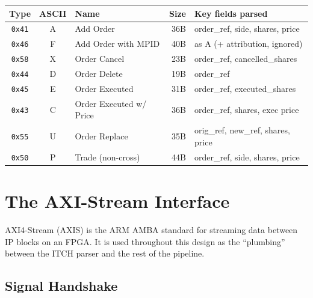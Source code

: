 \documentclass[11pt,a4paper]{article}
\begin{document}
\begin{center}
\begin{tabular}{c c l r l}
\toprule
\textbf{Type} & \textbf{ASCII} & \textbf{Name} & \textbf{Size} & \textbf{Key fields parsed} \\
\midrule
\texttt{0x41} & A & Add Order               & 36B & order\_ref, side, shares, price \\
\texttt{0x46} & F & Add Order with MPID     & 40B & as A (+ attribution, ignored) \\
\texttt{0x58} & X & Order Cancel            & 23B & order\_ref, cancelled\_shares \\
\texttt{0x44} & D & Order Delete            & 19B & order\_ref \\
\texttt{0x45} & E & Order Executed          & 31B & order\_ref, executed\_shares \\
\texttt{0x43} & C & Order Executed w/ Price & 36B & order\_ref, shares, exec price \\
\texttt{0x55} & U & Order Replace           & 35B & orig\_ref, new\_ref, shares, price \\
\texttt{0x50} & P & Trade (non-cross)       & 44B & order\_ref, side, shares, price \\
\bottomrule
\end{tabular}
\end{center}

\section{The AXI-Stream Interface}

AXI4-Stream (AXIS) is the ARM AMBA standard for streaming data between IP
blocks on an FPGA. It is used throughout this design as the ``plumbing''
between the ITCH parser and the rest of the pipeline.

\subsection{Signal Handshake}

\begin{center}
\end{center}
\end{document}
